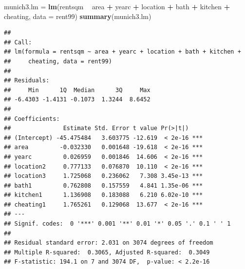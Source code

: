 \documentclass[10pt,ignorenonframetext,]{beamer}
\newenvironment{Shaded}{\begin{snugshade}}{\end{snugshade}}
\newcommand{\KeywordTok}[1]{\textcolor[rgb]{0.13,0.29,0.53}{\textbf{#1}}}
\newcommand{\DataTypeTok}[1]{\textcolor[rgb]{0.13,0.29,0.53}{#1}}
\newcommand{\StringTok}[1]{\textcolor[rgb]{0.31,0.60,0.02}{#1}}
\newcommand{\OperatorTok}[1]{\textcolor[rgb]{0.81,0.36,0.00}{\textbf{#1}}}
\newcommand{\NormalTok}[1]{#1}
\begin{document}
\begin{frame}[fragile]

\footnotesize

\begin{Shaded}
\begin{Highlighting}[]
\NormalTok{munich3.lm =}\StringTok{ }\KeywordTok{lm}\NormalTok{(rentsqm }\OperatorTok{~}\StringTok{ }\NormalTok{area }\OperatorTok{+}\StringTok{ }\NormalTok{yearc }\OperatorTok{+}\StringTok{ }\NormalTok{location }\OperatorTok{+}\StringTok{ }\NormalTok{bath }\OperatorTok{+}\StringTok{ }\NormalTok{kitchen }\OperatorTok{+}\StringTok{ }
\StringTok{    }\NormalTok{cheating, }\DataTypeTok{data =}\NormalTok{ rent99)}
\KeywordTok{summary}\NormalTok{(munich3.lm)}
\end{Highlighting}
\end{Shaded}

\begin{verbatim}
## 
## Call:
## lm(formula = rentsqm ~ area + yearc + location + bath + kitchen + 
##     cheating, data = rent99)
## 
## Residuals:
##     Min      1Q  Median      3Q     Max 
## -6.4303 -1.4131 -0.1073  1.3244  8.6452 
## 
## Coefficients:
##               Estimate Std. Error t value Pr(>|t|)    
## (Intercept) -45.475484   3.603775 -12.619  < 2e-16 ***
## area         -0.032330   0.001648 -19.618  < 2e-16 ***
## yearc         0.026959   0.001846  14.606  < 2e-16 ***
## location2     0.777133   0.076870  10.110  < 2e-16 ***
## location3     1.725068   0.236062   7.308 3.45e-13 ***
## bath1         0.762808   0.157559   4.841 1.35e-06 ***
## kitchen1      1.136908   0.183088   6.210 6.02e-10 ***
## cheating1     1.765261   0.129068  13.677  < 2e-16 ***
## ---
## Signif. codes:  0 '***' 0.001 '**' 0.01 '*' 0.05 '.' 0.1 ' ' 1
## 
## Residual standard error: 2.031 on 3074 degrees of freedom
## Multiple R-squared:  0.3065, Adjusted R-squared:  0.3049 
## F-statistic: 194.1 on 7 and 3074 DF,  p-value: < 2.2e-16
\end{verbatim}

\normalsize

\end{frame}
\end{document}
